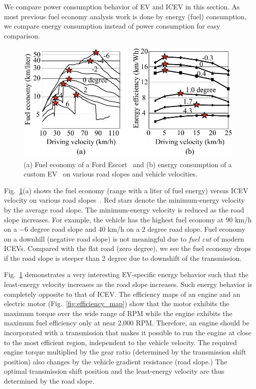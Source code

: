 \documentclass{IEEEtran}
\begin{document}
We compare power consumption behavior of EV and ICEV in this section. As most previous fuel economy analysis work is done by energy (fuel) consumption, we compare energy consumption instead of power consumption for easy comparison. 

\begin{figure}	%
\includegraphics[width=1.0\hsize]{Figures/ICEV_EV_consumption.pdf}
\caption{(a) Fuel economy of a Ford Escort~\cite{Hooker:TR88} and (b) energy consumption of a custom EV~\cite{Chang:ICCAD14} on various road slopes and vehicle velocities.}
\label{fig:ICEV_EV_consumption}
\end{figure} 

Fig.~\ref{fig:ICEV_EV_consumption}(a) shows the fuel economy (range with a liter of fuel energy) versus ICEV velocity on various road slopes~\cite{Hooker:TR88}. Red stars denote  the minimum-energy velocity by the average road slope. The minimum-energy velocity is reduced as the road slope increases. For example, the vehicle has the highest fuel economy at 90 km/h on  a $-6$ degree road slope and 40 km/h on a 2 degree road slope.  Fuel economy on a downhill (negative road slope) is not meaningful due to  \textit{fuel cut} of modern ICEVs. Compared with the flat road (zero degree), we see the fuel economy drops if the road slope is steeper than 2 degree due to downshift of the transmission. 

Fig.~\ref{fig:ICEV_EV_consumption} demonstrates a very interesting EV-specific energy behavior such that the least-energy velocity increases as the road slope increases. Such energy behavior is completely opposite to that of ICEV. 
%
The efficiency maps of an  engine and an electric motor (Fig.~\ref{fig:efficiency_map}) show that the motor exhibits  the maximum torque over the wide range of RPM while the engine exhibits the maximum fuel efficiency only at near 2,000 RPM. Therefore, an engine should be incorporated with a transmission that makes it possible to run the engine at close to the most efficient region, independent to the vehicle velocity. The required engine torque multiplied by the gear ratio (determined by the transmission shift position) also changes by the vehicle gradient resistance (road slope.) The optimal  transmission shift position and the least-energy velocity are thus determined by the road slope.
\end{document}
